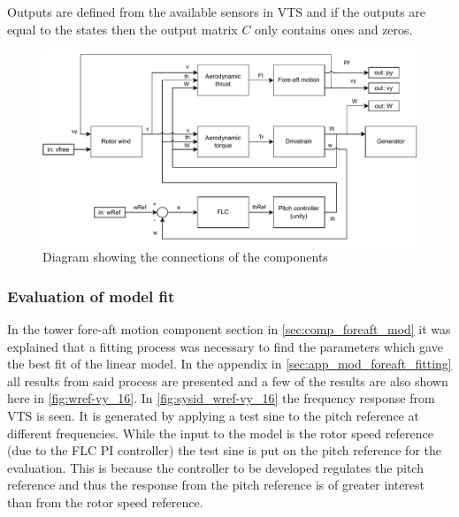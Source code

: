 Outputs are defined from the available sensors in VTS and if the outputs are equal to the states then the output matrix $ C $ only contains ones and zeros.

\begin{figure}[ht]
	\centering
	\includegraphics[width=0.99\linewidth]{Graphics/wtLinComponents.pdf}
	\caption{Diagram showing the connections of the components}
	\label{fig:connected_components}
\end{figure}

\subsubsection{Evaluation of model fit} \label{sec:lin_fit_eval}
In the tower fore-aft motion component section in \cref{sec:comp_foreaft_mod} it was explained that a fitting process was necessary to find the parameters which gave the best fit of the linear model. In the appendix in \cref{sec:app_mod_foreaft_fitting} all results from said process are presented and a few of the results are also shown here in \cref{fig:wref-vy_16}. In \cref{fig:sysid_wref-vy_16} the frequency response from VTS is seen. It is generated by applying a test sine to the pitch reference at different frequencies. While the input to the model is the rotor speed reference (due to the FLC PI controller) the test sine is put on the pitch reference for the evaluation. This is because the controller to be developed regulates the pitch reference and thus the response from the pitch reference is of greater interest than from the rotor speed reference. 

